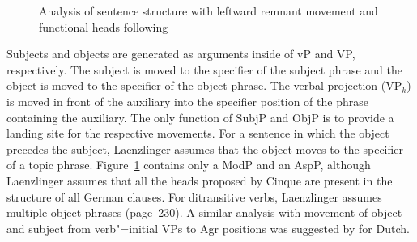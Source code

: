 \begin{figure}
\caption{\label{Abbildung-Remnant-Movement-Satzstruktur}Analysis of sentence structure with leftward remnant movement
  and functional heads following \citet[]{Laenzlinger2004a}}
\end{figure}%
Subjects and objects are generated as arguments inside of vP and VP, respectively. The subject is moved to the specifier of the subject phrase
and the object is moved to the specifier of the object phrase. The verbal projection (VP$_k$) is moved in front of
the auxiliary into the specifier position of the phrase containing the auxiliary. The only function of SubjP and ObjP is to provide a landing site
for the respective movements. For a sentence in which the object precedes the subject, Laenzlinger assumes that the object moves to the specifier of a topic
phrase. Figure~\ref{Abbildung-Remnant-Movement-Satzstruktur} contains only a ModP and an AspP, although Laenzlinger assumes that all the heads proposed by Cinque are present
in the structure of all German clauses. For ditransitive verbs, Laenzlinger assumes multiple object
phrases (page~230). A similar analysis with movement of object and subject from verb"=initial VPs to
Agr positions was suggested by \citet{Zwart1994a-u} for Dutch.


